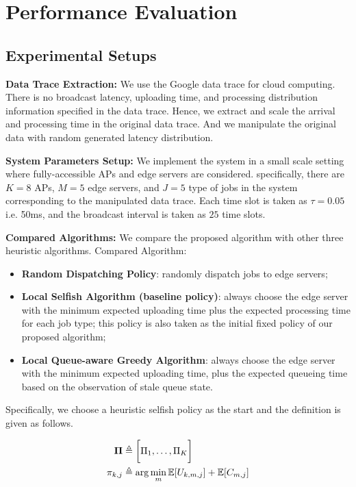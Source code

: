 \section{Performance Evaluation}
\label{sec:evaluation}


\subsection{Experimental Setups}

\textbf{Data Trace Extraction:}
We use the Google data trace for cloud computing.
There is no broadcast latency, uploading time, and processing distribution information specified in the data trace.
Hence, we extract and scale the arrival and processing time in the original data trace.
And we manipulate the original data with random generated latency distribution.

\textbf{System Parameters Setup:}
We implement the system in a small scale setting where fully-accessible APs and edge servers are considered.
specifically, there are $K=8$ APs, $M=5$ edge servers, and $J=5$ type of jobs in the system corresponding to the manipulated data trace.
Each time slot is taken as $\tau = 0.05$ i.e. 50ms, and the broadcast interval is taken as $25$ time slots.

\textbf{Compared Algorithms:}
We compare the proposed algorithm with other three heuristic algorithms.
Compared Algorithm:
\begin{itemize}
    \item \textbf{Random Dispatching Policy}:
            randomly dispatch jobs to edge servers;
    \item \textbf{Local Selfish Algorithm (baseline policy)}:
            always choose the edge server with the minimum expected uploading time plus the expected processing time for each job type; this policy is also taken as the initial fixed policy of our proposed algorithm;
    \item \textbf{Local Queue-aware Greedy Algorithm}:
            always choose the edge server with the minimum expected uploading time, plus the expected queueing time based on the observation of stale queue state.
\end{itemize}
Specifically, we choose a heuristic selfish policy as the start and the definition is given as follows.
\begin{definition}
    \begin{align}
        \boldsymbol{\Pi} &\triangleq \bigg[ \Pi_{1}, \dots, \Pi_{K} \bigg]
        \\
        \pi_{k,j} &\triangleq \arg\min_{m} \mathbb{E}[U_{k,m,j}] + \mathbb{E}[C_{m,j}]
    \end{align}
\end{definition}

